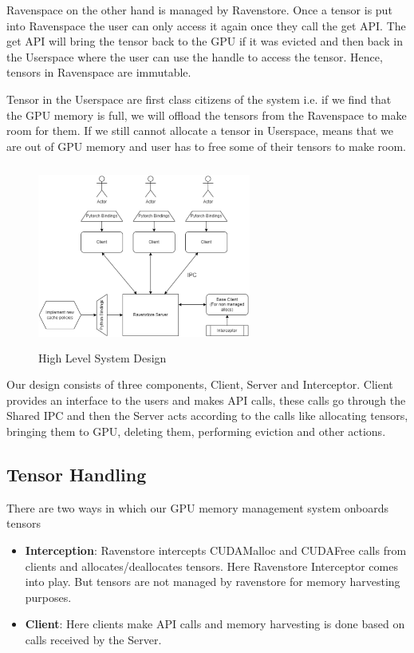 \documentclass{article}
\begin{document}
Ravenspace on the other hand is managed by Ravenstore. Once a tensor is put into Ravenspace the user
can only access it again once they call the get API. The get API will bring the tensor back to the GPU if it was evicted
and then back in the Userspace where the user can use the handle to access the tensor. Hence, tensors in 
Ravenspace are immutable.

Tensor in the Userspace are first class citizens of the system i.e. if we find that the GPU memory is full,
we will offload the tensors from the Ravenspace to make room for them. If we still cannot allocate a tensor in Userspace,
means that we are out of GPU memory and user has to free some of their tensors to make room.

\begin{figure}[!htbp]
	\centering
	\includegraphics[height=6cm, width=7cm]{figures/hld.png}
	\caption{High Level System Design}
\end{figure}

Our design consists of three components, Client, Server and Interceptor. Client provides an interface to the users and makes API calls, 
these calls go through the Shared IPC and then the Server acts according to the calls like allocating tensors,
bringing them to GPU, deleting them, performing eviction and other actions. 

\subsection{Tensor Handling}
There are two ways in which our GPU memory management system onboards tensors
\begin{itemize}
	\item \textbf{Interception}: Ravenstore intercepts CUDAMalloc and CUDAFree calls from clients
	and allocates/deallocates tensors. Here Ravenstore Interceptor comes into play. But tensors are not managed by ravenstore for memory harvesting purposes.
	\item \textbf{Client}: Here clients make API calls and memory harvesting is done based on calls received by the Server.
\end{itemize}
\end{document}
